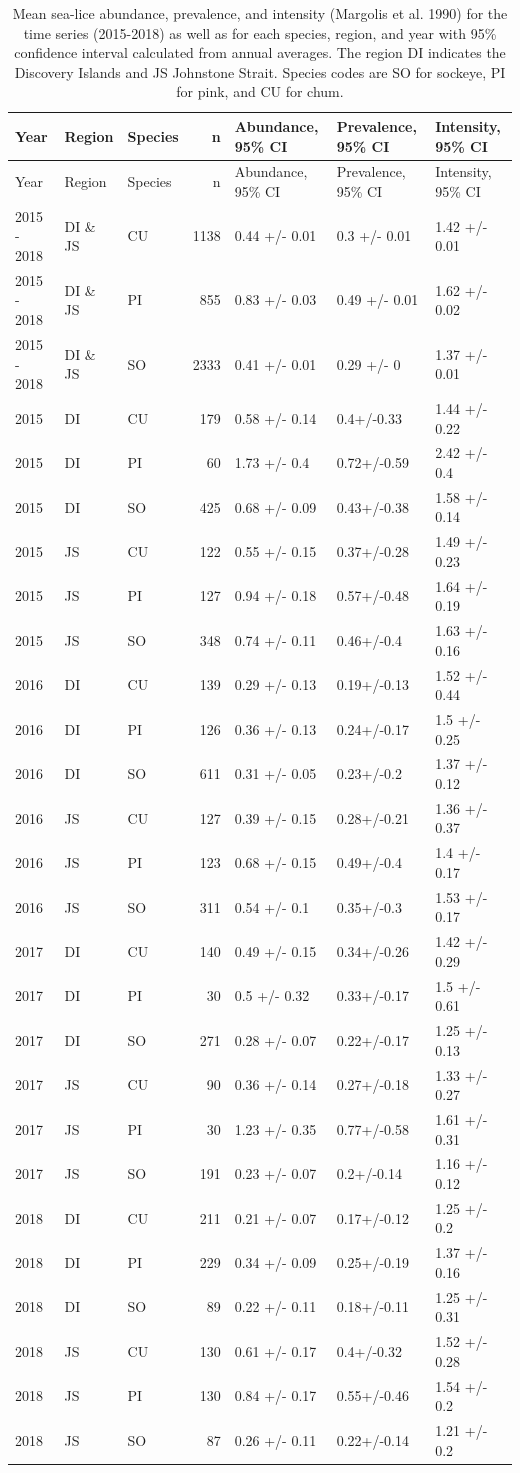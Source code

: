 \documentclass[fleqn,10pt]{wlpeerj} %
\begin{document}
\begin{longtable}[]{@{}lllrlll@{}}
\caption{\label{tab:parasites} Mean sea-lice abundance, prevalence, and
intensity (Margolis et al. 1990) for the time series (2015-2018) as well
as for each species, region, and year with 95\% confidence interval
calculated from annual averages. The region DI indicates the Discovery
Islands and JS Johnstone Strait. Species codes are SO for sockeye, PI
for pink, and CU for chum.}\tabularnewline
\toprule
Year & Region & Species & n & Abundance, 95\% CI & Prevalence, 95\% CI &
Intensity, 95\% CI\tabularnewline
\midrule
\endfirsthead
\toprule
Year & Region & Species & n & Abundance, 95\% CI & Prevalence, 95\% CI &
Intensity, 95\% CI\tabularnewline
\midrule
\endhead
2015 - 2018 & DI \& JS & CU & 1138 & 0.44 +/- 0.01 & 0.3 +/- 0.01 & 1.42
+/- 0.01\tabularnewline
2015 - 2018 & DI \& JS & PI & 855 & 0.83 +/- 0.03 & 0.49 +/- 0.01 & 1.62
+/- 0.02\tabularnewline
2015 - 2018 & DI \& JS & SO & 2333 & 0.41 +/- 0.01 & 0.29 +/- 0 & 1.37
+/- 0.01\tabularnewline
2015 & DI & CU & 179 & 0.58 +/- 0.14 & 0.4+/-0.33 & 1.44 +/-
0.22\tabularnewline
2015 & DI & PI & 60 & 1.73 +/- 0.4 & 0.72+/-0.59 & 2.42 +/-
0.4\tabularnewline
2015 & DI & SO & 425 & 0.68 +/- 0.09 & 0.43+/-0.38 & 1.58 +/-
0.14\tabularnewline
2015 & JS & CU & 122 & 0.55 +/- 0.15 & 0.37+/-0.28 & 1.49 +/-
0.23\tabularnewline
2015 & JS & PI & 127 & 0.94 +/- 0.18 & 0.57+/-0.48 & 1.64 +/-
0.19\tabularnewline
2015 & JS & SO & 348 & 0.74 +/- 0.11 & 0.46+/-0.4 & 1.63 +/-
0.16\tabularnewline
2016 & DI & CU & 139 & 0.29 +/- 0.13 & 0.19+/-0.13 & 1.52 +/-
0.44\tabularnewline
2016 & DI & PI & 126 & 0.36 +/- 0.13 & 0.24+/-0.17 & 1.5 +/-
0.25\tabularnewline
2016 & DI & SO & 611 & 0.31 +/- 0.05 & 0.23+/-0.2 & 1.37 +/-
0.12\tabularnewline
2016 & JS & CU & 127 & 0.39 +/- 0.15 & 0.28+/-0.21 & 1.36 +/-
0.37\tabularnewline
2016 & JS & PI & 123 & 0.68 +/- 0.15 & 0.49+/-0.4 & 1.4 +/-
0.17\tabularnewline
2016 & JS & SO & 311 & 0.54 +/- 0.1 & 0.35+/-0.3 & 1.53 +/-
0.17\tabularnewline
2017 & DI & CU & 140 & 0.49 +/- 0.15 & 0.34+/-0.26 & 1.42 +/-
0.29\tabularnewline
2017 & DI & PI & 30 & 0.5 +/- 0.32 & 0.33+/-0.17 & 1.5 +/-
0.61\tabularnewline
2017 & DI & SO & 271 & 0.28 +/- 0.07 & 0.22+/-0.17 & 1.25 +/-
0.13\tabularnewline
2017 & JS & CU & 90 & 0.36 +/- 0.14 & 0.27+/-0.18 & 1.33 +/-
0.27\tabularnewline
2017 & JS & PI & 30 & 1.23 +/- 0.35 & 0.77+/-0.58 & 1.61 +/-
0.31\tabularnewline
2017 & JS & SO & 191 & 0.23 +/- 0.07 & 0.2+/-0.14 & 1.16 +/-
0.12\tabularnewline
2018 & DI & CU & 211 & 0.21 +/- 0.07 & 0.17+/-0.12 & 1.25 +/-
0.2\tabularnewline
2018 & DI & PI & 229 & 0.34 +/- 0.09 & 0.25+/-0.19 & 1.37 +/-
0.16\tabularnewline
2018 & DI & SO & 89 & 0.22 +/- 0.11 & 0.18+/-0.11 & 1.25 +/-
0.31\tabularnewline
2018 & JS & CU & 130 & 0.61 +/- 0.17 & 0.4+/-0.32 & 1.52 +/-
0.28\tabularnewline
2018 & JS & PI & 130 & 0.84 +/- 0.17 & 0.55+/-0.46 & 1.54 +/-
0.2\tabularnewline
2018 & JS & SO & 87 & 0.26 +/- 0.11 & 0.22+/-0.14 & 1.21 +/-
0.2\tabularnewline
\bottomrule
\end{longtable}
\end{document}
